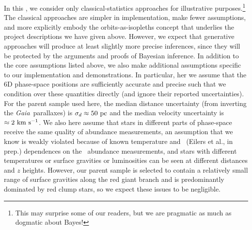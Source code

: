 \documentclass[modern]{aastex63}
\newcommand{\gaia}{\textsl{Gaia}}
\newcommand{\apogee}{\acronym{APOGEE}}
\begin{document}
In this \documentname, we consider only classical-statistics approaches for
illustrative purposes.\footnote{This may surprise some of our readers, but we
are pragmatic as much as dogmatic about Bayes!}
The classical approaches are simpler in implementation, make fewer assumptions,
and more explicitly embody the orbits-as-isopleths concept that underlies the
project descriptions we have given above.
However, we expect that generative approaches will produce at least slightly
more precise inferences, since they will be protected by the arguments and
proofs of Bayesian inference.
In addition to the core assumptions listed above, we also make additional
assumptions specific to our implementation and demonstrations.
In particular, her we assume that the 6D phase-space positions are sufficiently
accurate and precise such that we condition over these quantities directly (and
ignore their reported uncertainties).
For the parent sample used here, the median distance uncertainty (from inverting
the \gaia\ parallaxes) is $\sigma_d \approx 50~\mathrm{pc}$ and the median velocity
uncertainty is $\approx 2~\mathrm{km}~\mathrm{s}^{-1}$.
We also here assume that stars in different parts of phase-space receive the
same quality of abundance measurements, an assumption that we know is weakly
violated because of known temperature \citep{Wheeler} and \logg\ (Eilers et al.,
in prep.) dependences on the \apogee\ abundance measurements, and stars with
different temperatures or surface gravities or luminosities can be seen at
different distances and $z$ heights.
However, our parent sample is selected to contain a relatively small range of
surface gravities along the red giant branch and is predominantly dominated by
red clump stars, so we expect these issues to be negligible.
\end{document}
